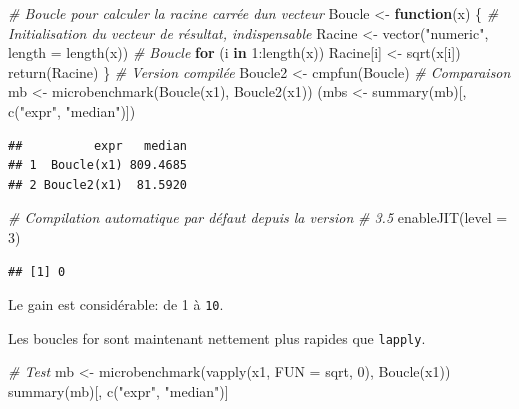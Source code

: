 \documentclass[
  11pt,
  french,
  a4paper,
  extrafontsizes,onecolumn,openright
  ]{memoir}
\newenvironment{Shaded}{\begin{snugshade}}{\end{snugshade}}
\newcommand{\AttributeTok}[1]{\textcolor[rgb]{0.77,0.63,0.00}{#1}}
\newcommand{\CommentTok}[1]{\textcolor[rgb]{0.56,0.35,0.01}{\textit{#1}}}
\newcommand{\ControlFlowTok}[1]{\textcolor[rgb]{0.13,0.29,0.53}{\textbf{#1}}}
\newcommand{\DecValTok}[1]{\textcolor[rgb]{0.00,0.00,0.81}{#1}}
\newcommand{\FunctionTok}[1]{\textcolor[rgb]{0.00,0.00,0.00}{#1}}
\newcommand{\NormalTok}[1]{#1}
\newcommand{\OtherTok}[1]{\textcolor[rgb]{0.56,0.35,0.01}{#1}}
\newcommand{\SpecialCharTok}[1]{\textcolor[rgb]{0.00,0.00,0.00}{#1}}
\newcommand{\StringTok}[1]{\textcolor[rgb]{0.31,0.60,0.02}{#1}}
\begin{document}
\begin{Shaded}
\begin{Highlighting}[]
\CommentTok{\# Boucle pour calculer la racine carrée d\textquotesingle{}un vecteur}
\NormalTok{Boucle }\OtherTok{\textless{}{-}} \ControlFlowTok{function}\NormalTok{(x) \{}
    \CommentTok{\# Initialisation du vecteur de résultat, indispensable}
\NormalTok{    Racine }\OtherTok{\textless{}{-}} \FunctionTok{vector}\NormalTok{(}\StringTok{"numeric"}\NormalTok{, }\AttributeTok{length =} \FunctionTok{length}\NormalTok{(x))}
    \CommentTok{\# Boucle}
    \ControlFlowTok{for}\NormalTok{ (i }\ControlFlowTok{in} \DecValTok{1}\SpecialCharTok{:}\FunctionTok{length}\NormalTok{(x)) Racine[i] }\OtherTok{\textless{}{-}} \FunctionTok{sqrt}\NormalTok{(x[i])}
    \FunctionTok{return}\NormalTok{(Racine)}
\NormalTok{\}}
\CommentTok{\# Version compilée}
\NormalTok{Boucle2 }\OtherTok{\textless{}{-}} \FunctionTok{cmpfun}\NormalTok{(Boucle)}
\CommentTok{\# Comparaison}
\NormalTok{mb }\OtherTok{\textless{}{-}} \FunctionTok{microbenchmark}\NormalTok{(}\FunctionTok{Boucle}\NormalTok{(x1), }\FunctionTok{Boucle2}\NormalTok{(x1))}
\NormalTok{(mbs }\OtherTok{\textless{}{-}} \FunctionTok{summary}\NormalTok{(mb)[, }\FunctionTok{c}\NormalTok{(}\StringTok{"expr"}\NormalTok{, }\StringTok{"median"}\NormalTok{)])}
\end{Highlighting}
\end{Shaded}

\begin{verbatim}
##          expr   median
## 1  Boucle(x1) 809.4685
## 2 Boucle2(x1)  81.5920
\end{verbatim}

\begin{Shaded}
\begin{Highlighting}[]
\CommentTok{\# Compilation automatique par défaut depuis la version}
\CommentTok{\# 3.5}
\FunctionTok{enableJIT}\NormalTok{(}\AttributeTok{level =} \DecValTok{3}\NormalTok{)}
\end{Highlighting}
\end{Shaded}

\begin{verbatim}
## [1] 0
\end{verbatim}

\normalsize
Le gain est considérable: de 1 à \texttt{10}.

Les boucles for sont maintenant nettement plus rapides que \texttt{lapply}.

\scriptsize

\begin{Shaded}
\begin{Highlighting}[]
\CommentTok{\# Test}
\NormalTok{mb }\OtherTok{\textless{}{-}} \FunctionTok{microbenchmark}\NormalTok{(}\FunctionTok{vapply}\NormalTok{(x1, }\AttributeTok{FUN =}\NormalTok{ sqrt, }\DecValTok{0}\NormalTok{), }\FunctionTok{Boucle}\NormalTok{(x1))}
\FunctionTok{summary}\NormalTok{(mb)[, }\FunctionTok{c}\NormalTok{(}\StringTok{"expr"}\NormalTok{, }\StringTok{"median"}\NormalTok{)]}
\end{Highlighting}
\end{Shaded}
\end{document}
